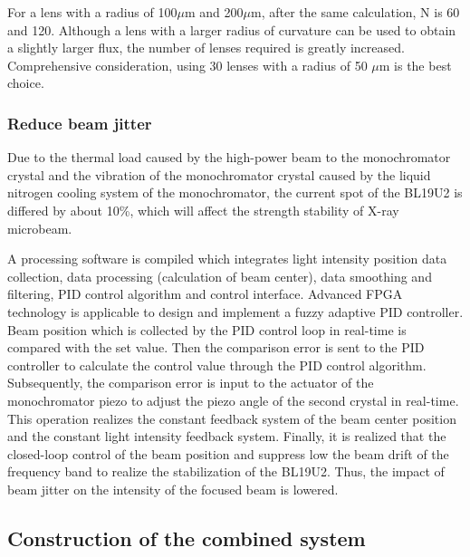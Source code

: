 \documentclass{Head}
\begin{document}
For a lens with a radius of 100$\mu$m and 200$\mu$m, after the same calculation, N is 60 and 120.
Although a lens with a larger radius of curvature can be used to obtain a slightly larger flux, the number of lenses required is greatly increased.
Comprehensive consideration, using 30 lenses with a radius of 50 $\mu$m is the best choice.
\subsubsection{Reduce beam jitter}
Due to the thermal load caused by the high-power beam to the monochromator crystal and the vibration of the monochromator crystal caused by the liquid nitrogen cooling system of the monochromator, the current spot of the BL19U2 is differed by about 10\%, which will affect the strength stability of X-ray microbeam.


A processing software is compiled which integrates light intensity position data collection, data processing (calculation of beam center), data smoothing and filtering, PID control algorithm and control interface.
Advanced FPGA technology is applicable to design and implement a fuzzy adaptive PID controller.
Beam position which is collected by the PID control loop in real-time is compared with the set value.
Then the comparison error is sent to the PID controller to calculate the control value through the PID control algorithm.
Subsequently, the comparison error is input to the actuator of the monochromator piezo to adjust the piezo angle of the second crystal in real-time. This operation realizes the constant feedback system of the beam center position and the constant light intensity feedback system.
Finally, it is realized that the closed-loop control of the beam position and suppress low the beam drift of the frequency band to realize the stabilization of the BL19U2.
Thus, the impact of beam jitter on the intensity of the focused beam is lowered.
\subsection{Construction of the combined system}
\end{document}
